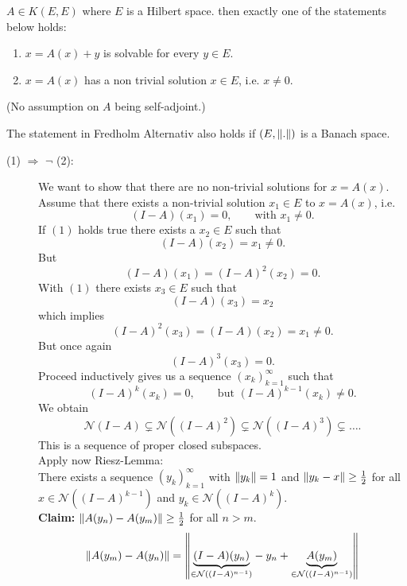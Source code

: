 \begin{theorem}
$A \in K(E,E)$ where $E$ is a Hilbert space. then exactly one of the statements below holds:
\begin{enumerate}
	\item $x = A(x) + y$ is solvable for every $y \in E$.
	\item $x = A(x)$ has a non trivial solution $x \in E$, i.e. $x \neq 0$.
\end{enumerate}
(No assumption on $A$ being self-adjoint.)
\end{theorem}
\begin{bemerkung}
	The statement in Fredholm Alternativ also holds if $(E,\norm{.})$ is a Banach space.
\end{bemerkung}
\begin{beweis}
	\begin{description}
		\item[(1) $\Rightarrow$ $ \lnot$ (2):] We want to show that there are no non-trivial solutions for $x = A(x)$. \\
		Assume that there exists a non-trivial solution $x_1 \in E$ to $x = A(x)$, i.e.
		\[
			(I-A)(x_1)=0, \qquad \text{with }x_1 \neq 0.
		\]
		If $(1)$ holds true there exists a $x_2 \in E$ such that
		\[
			(I-A)(x_2) = x_1 \neq 0.
		\]
		But
		\[
			(I-A)(x_1) = (I-A)^2(x_2) = 0.
		\]
		With $(1)$ there exists $x_3 \in E$ such that 
		\[
			(I-A)(x_3) = x_2
		\]
		which implies
		\[
			(I-A)^2(x_3) = (I-A)(x_2) = x_1 \neq 0.
		\]
		But once again
		\[
			(I-A)^3(x_3)=0.
		\]
		Proceed inductively gives us a sequence $(x_k)_{k=1}^{\infty}$ such that
		\[
			(I-A)^k(x_k) =0, \qquad \text{but }(I-A)^{k-1}(x_k) \neq 0.
		\]
		We obtain
		\[
			\mathcal{N}(I-A) \subsetneq \mathcal{N}((I-A)^2) \subsetneq \mathcal{N}((I-A)^3) \subsetneq \dots.
		\]
		This is a sequence of proper closed subspaces.  \\
		Apply now Riesz-Lemma: \\
		There exists a sequence $(y_k)_{k=1}^{\infty}$ with $\norm{y_k} = 1$ and $\norm{y_k - x} \geq \frac{1}{2}$ for all $x \in \mathcal{N}((I-A)^{k-1})$ and 
		$y_k \in \mathcal{N}((I-A)^k)$. \\
		\textbf{Claim:} \text{    }$\norm{A(y_n)- A(y_m)} \geq \frac{1}{2}$ for all $n >m$. \\
		\begin{align*}
			\norm{A(y_m)- A(y_n)} &= \norm{\underset{\in \mathcal{N}((I-A)^{n-1})}{\underbrace{(I-A)(y_n)}} - y_n + \underset{\in \mathcal{N}((I-A)^{n-1})}{\underbrace{A(y_m)}}} \\

\end{align*}
\end{description}
\end{beweis}
